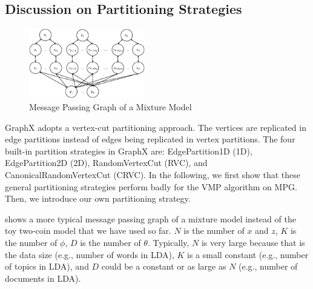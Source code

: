 \subsection{Discussion on Partitioning Strategies}

\begin{figure}[h]
	\includegraphics[width=0.45\textwidth]{figs/mixture_mpg.eps}
	\caption{Message Passing Graph of a Mixture Model}
	\label{fig:mixture_mpg}
\end{figure}

GraphX adopts a vertex-cut partitioning approach.
The vertices are replicated in edge partitions instead of edges being replicated in vertex
partitions. 
The four built-in partition
strategies in GraphX are: 
EdgePartition1D (1D),
EdgePartition2D  (2D),
RandomVertexCut (RVC), and
CanonicalRandomVertexCut (CRVC).
In the following, we first show that these general 
partitioning strategies perform badly for the VMP algorithm on MPG.
Then, we introduce our own partitioning strategy.

 shows a more typical message passing graph of a
mixture model instead of the toy two-coin model that we have used so far. $N$
is the number of $x$ and $z$, $K$ is the number of $\phi$, $D$ is the number
of $\theta$. Typically, $N$ is very large because that is the data size (e.g.,
number of words in LDA), $K$ is a small constant (e.g., number of topics in
LDA), and $D$ could be a constant or as large as $N$ (e.g., number of
documents in LDA). 


